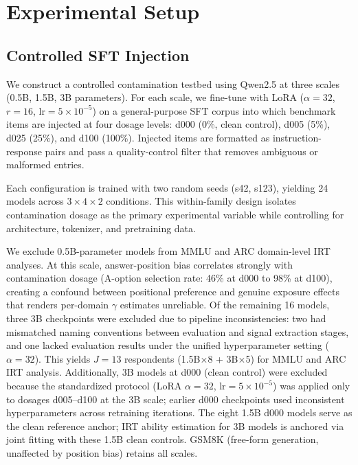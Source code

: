 \section{Experimental Setup}
\label{sec:experiments}

\subsection{Controlled SFT Injection}
\label{sec:injection}

We construct a controlled contamination testbed using Qwen2.5 at three scales (0.5B, 1.5B, 3B parameters). For each scale, we fine-tune with LoRA ($\alpha=32$, $r=16$, lr$=5\times10^{-5}$) on a general-purpose SFT corpus into which benchmark items are injected at four dosage levels: d000 (0\%, clean control), d005 (5\%), d025 (25\%), and d100 (100\%). Injected items are formatted as instruction-response pairs and pass a quality-control filter that removes ambiguous or malformed entries.

Each configuration is trained with two random seeds (s42, s123), yielding 24 models across $3 \times 4 \times 2$ conditions. This within-family design isolates contamination dosage as the primary experimental variable while controlling for architecture, tokenizer, and pretraining data.

We exclude 0.5B-parameter models from MMLU and ARC domain-level IRT analyses. At this scale, answer-position bias correlates strongly with contamination dosage (A-option selection rate: 46\% at d000 to 98\% at d100), creating a confound between positional preference and genuine exposure effects that renders per-domain $\gamma$ estimates unreliable. Of the remaining 16 models, three 3B checkpoints were excluded due to pipeline inconsistencies: two had mismatched naming conventions between evaluation and signal extraction stages, and one lacked evaluation results under the unified hyperparameter setting ($\alpha=32$). This yields $J=13$ respondents (1.5B$\times$8 + 3B$\times$5) for MMLU and ARC IRT analysis. Additionally, 3B models at d000 (clean control) were excluded because the standardized protocol (LoRA $\alpha=32$, lr$=5\times10^{-5}$) was applied only to dosages d005--d100 at the 3B scale; earlier d000 checkpoints used inconsistent hyperparameters across retraining iterations. The eight 1.5B d000 models serve as the clean reference anchor; IRT ability estimation for 3B models is anchored via joint fitting with these 1.5B clean controls. GSM8K (free-form generation, unaffected by position bias) retains all scales.

